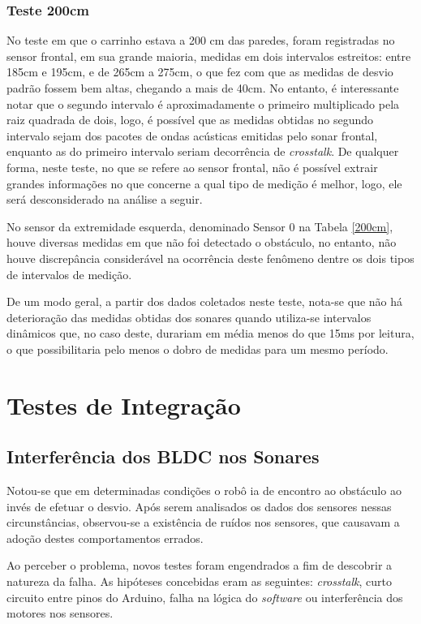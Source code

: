 \subsubsection{Teste 200cm}
No teste em que o carrinho estava a 200 cm das paredes, foram registradas no sensor frontal, em sua grande maioria, medidas em dois intervalos 
estreitos: entre 185cm e 195cm, e de 265cm a 275cm, o que fez com que as medidas de desvio padrão fossem bem altas, chegando a mais de 40cm.
No entanto, é interessante notar que o segundo intervalo é aproximadamente o primeiro multiplicado pela raiz quadrada de dois, logo, é possível que 
as medidas obtidas no segundo intervalo sejam dos pacotes de ondas acústicas emitidas pelo sonar frontal, enquanto as do primeiro intervalo seriam 
decorrência de \textit{crosstalk}.
De qualquer forma, neste teste, no que se refere ao sensor frontal, não é possível extrair grandes informações no que concerne a qual tipo de medição 
é melhor, logo, ele será desconsiderado na análise a seguir.

No sensor da extremidade esquerda, denominado Sensor 0 na Tabela \ref{200cm}, houve diversas medidas em que não foi detectado o obstáculo, no 
entanto, não houve discrepância considerável na ocorrência deste fenômeno dentre os dois tipos de intervalos de medição.

De um modo geral, a partir dos dados coletados neste teste, nota-se que não há deterioração das medidas obtidas dos sonares quando utiliza-se 
intervalos dinâmicos que, no caso deste, durariam em média menos do que 15ms por leitura, o que possibilitaria pelo menos o dobro de medidas 
para um mesmo período.


\section{Testes de Integração}
\subsection{Interferência dos BLDC nos Sonares}
Notou-se que em determinadas condições o robô ia de encontro ao obstáculo ao invés de efetuar o desvio. 
Após serem analisados os dados dos sensores nessas circunstâncias, observou-se a existência de ruídos nos sensores, que causavam a adoção 
destes comportamentos errados.

Ao perceber o problema, novos testes foram engendrados a fim de descobrir a natureza da falha.
As hipóteses concebidas eram as seguintes: \textit{crosstalk}, curto circuito entre pinos do Arduino, falha na lógica do \textit{software} ou 
interferência dos motores nos sensores.


